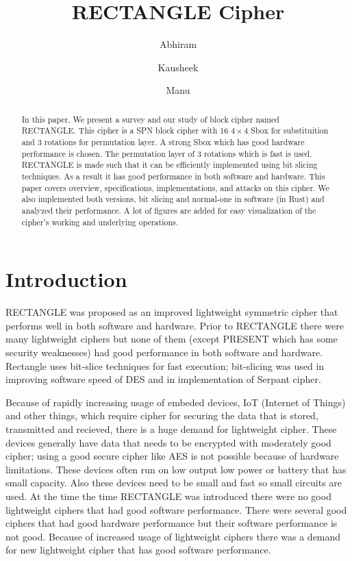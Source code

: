 \documentclass[final]{transcrypto}
\begin{document}
\title[short]{RECTANGLE Cipher}

\author{Abhiram \and Kausheek \and Manu}
\setDOI{}

\begin{abstract}
In this paper, We present a survey and our study of block cipher named RECTANGLE. This cipher is a SPN block cipher with 16 $4\times 4$ Sbox for substituition and 3 rotations for permutation layer. A strong Sbox which has good hardware performance is chosen. The permutation layer of 3 rotations which is fast is used. RECTANGLE is made such that it can be efficiently implemented using bit slicing techniques. As a result it has good performance in both software and hardware. This paper covers overview, specifications, implementations, and attacks on this cipher. We also implemented both versions, bit slicing and normal-one in software (in Rust) and analyzed their performance. A lot of figures are added for easy visualization of the cipher's working and underlying operations.
\end{abstract}
\maketitle
\section{Introduction}
RECTANGLE was proposed as an improved lightweight symmetric cipher that performs well in both software and hardware. Prior to RECTANGLE there were many lightweight ciphers but none of them (except PRESENT which has some security weaknesses) had good performance in both software and hardware. Rectangle uses bit-slice techniques for fast execution; bit-slicing was used in improving software speed of DES and in implementation of Serpant cipher.

Because of rapidly increasing usage of embeded devices, IoT (Internet of Things) and other things, which require cipher for securing the data that is stored, transmitted and recieved, there is a huge demand for lightweight cipher. These devices generally have data that needs to be encrypted with moderately good cipher; using a good secure cipher like AES is not possible because of hardware limitations. These devices often run on low output low power or battery that has small capacity. Also these devices need to be small and fast so small circuits are used. At the time the time RECTANGLE was introduced there were no good lightweight ciphers that had good software performance. There were several good ciphers that had good hardware performance but their software performance is not good. Because of increased usage of lightweight ciphers there was a demand for new lightweight cipher that has good software performance.
\end{document}
